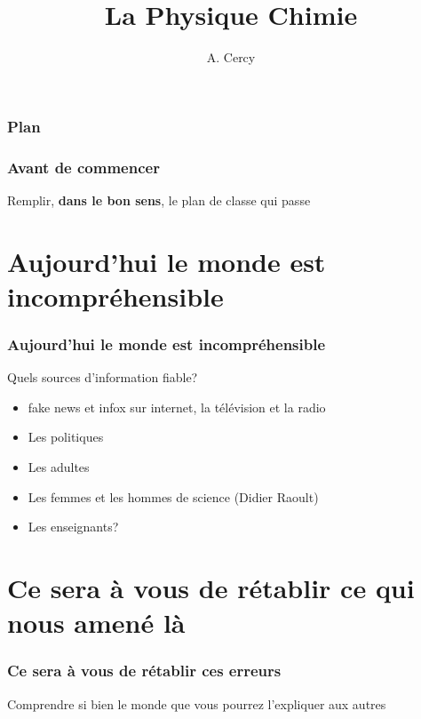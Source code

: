 \documentclass{beamer}
\title[Présentation]{La Physique Chimie} %
\author{A. Cercy} %
\institute[] %
{
Collège Pablo Neruda
}
\date{} %
\begin{document}
\begin{frame}
\titlepage %
\end{frame}

\begin{frame}
\frametitle{Plan} %
\tableofcontents %
\end{frame}

\begin{frame}
    \frametitle{Avant de commencer}
    \centerline{Remplir, \textbf{dans le bon sens}, le plan de classe qui passe}
\end{frame}


\section{Aujourd'hui le monde est incompréhensible}
\begin{frame}
\frametitle{Aujourd'hui le monde est incompréhensible}

Quels sources d'information fiable?
\begin{itemize}
    \item fake news et infox sur internet, la télévision et la radio
    \item Les politiques
    \item Les adultes
    \item Les femmes et les hommes de science (Didier Raoult)
    \item Les enseignants?
\end{itemize}
\end{frame}

\section{Ce sera à vous de rétablir ce qui nous amené là}
    \begin{frame}
        \frametitle{Ce sera à vous de rétablir ces erreurs}

        \begin{block}{Comprendre}
        si bien le monde que vous pourrez l'expliquer aux autres
        \end{block}
    \end{frame}
\end{document}
